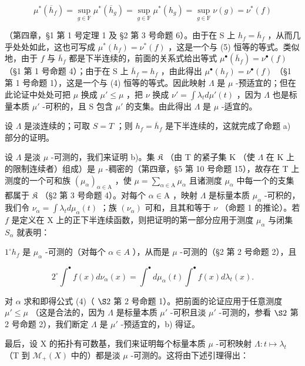 \[
\mu^ {*} (\overline {{h}} _ {f}) = \sup _ {g \in \mathrm{F}} \mu^ {*} (\overline {{h}} _ {g}) = \sup _ {g \in \mathrm{F}} \mu^ {*} (h _ {g}) = \sup _ {g \in \mathrm{F}} \nu (g) = \nu^ {*} (f)
\]

（第四章，§1 第 1 号定理 1 及 §2 第 3 号命题 6）。由于在 S 上 \(h_f = \overline{h}_f\) ，从而几乎处处如此，这也可写成 \(\mu^*(h_f) = \nu^*(f)\) ，这是一个与 (5) 恒等的等式。类似地，由于 \(f\) 与 \(\overline{h}_f\) 都是下半连续的，前面的关系式给出等式 \(\mu^\bullet(\overline{h}_f) = \nu^\bullet(f)\) （§1 第 1 号命题 4）；由于在 S 上 \(\overline{h}_f = h_f\) ，由此得出 \(\mu^\bullet(h_f) = \nu^\bullet(f)\) （§1 第 1 号命题 1），这是一个与 (4) 恒等的等式。因此映射 \(\Lambda\) 是 \(\mu\) -预适宜的；但在此论证中处处可把 \(\mu\) 换成 \(\mu' \leqslant \mu\) ，把 \(\nu\) 换成 \(\nu' = \int \lambda_t d\mu'(t)\) ，因为 \(\Lambda\) 也是标量本质 \(\mu'\) -可积的，且 S 包含 \(\mu'\) 的支集。由此得出 \(\Lambda\) 是 \(\mu\) -适宜的。

设 \(\Lambda\) 是淡连续的；可取 \(S = T\) ；则 \(h_f = \overline{h}_f\) 是下半连续的，这就完成了命题 a) 部分的证明。

设 \(\Lambda\) 是淡 \(\mu\) -可测的，我们来证明 b)。集 \(\mathfrak{K}\) （由 T 的紧子集 K （使 \(\Lambda\) 在 K 上的限制连续者）组成）是 \(\mu\) -稠密的（第四章，§5 第 10 号命题 15），故存在 T 上测度的一个可和族 \((\mu_{\alpha})_{\alpha \in \mathrm{A}}\) ，使 \(\mu = \sum_{\alpha \in \mathrm{A}} \mu_{\alpha}\) 且诸测度 \(\mu_{\alpha}\) 中每一个的支集都属于 \(\mathfrak{K}\) （§2 第 3 号命题 4）。对每个 \(\alpha \in \mathrm{A}\) ，映射 \(\Lambda\) 是标量本质 \(\mu_{\alpha}\) -可积的，我们令 \(\nu_{\alpha} = \int \lambda_t d\mu_{\alpha}(t)\) ；族 \((\nu_{\alpha})\) 可和，且其和等于 \(\nu\) （命题 1 的推论）。若 \(f\) 是定义在 X 上的正下半连续函数，则把证明的第一部分应用于测度 \(\mu_{\alpha}\) 与闭集 \(S_{\alpha}\) 就表明：

\(1^{\circ} h_{f}\) 是 \(\mu_{\alpha}\) -可测的（对每个 \(\alpha \in A\) ），从而是 \(\mu\) -可测的（§2 第 2 号命题 2），且

\[
2 ^ {\circ} \int^ {\bullet} f (x) d \nu_ {\alpha} (x) = \int^ {\bullet} d \mu_ {\alpha} (t) \int^ {\bullet} f (x) d \lambda_ {t} (x).
\]

对 \(\alpha\) 求和即得公式 (4)（ \(\S 2\) 第 2 号命题 1）。把前面的论证应用于任意测度 \(\mu' \leqslant \mu\) （这是合法的，因为 \(\Lambda\) 是标量本质 \(\mu'\) -可积且淡 \(\mu'\) -可测的，参看 \(\S 2\) 第 2 号命题 2），我们断定 \(\Lambda\) 是 \(\mu'\) -预适宜的，b) 得证。

最后，设 X 的拓扑有可数基，我们来证明每个标量本质 \(\mu\) -可积映射 \(\Lambda: t \mapsto \lambda_{t}\) （T 到 \(\mathcal{M}_{+}(X)\) 中的）都是淡 \(\mu\) -可测的。这将由下述引理得出：

